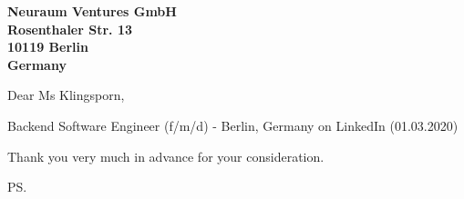 \documentclass[a4paper]{cover-letter}
\begin{document}
\longindentation=0pt

\newcommand{\companyName}{Neuraum Ventures GmbH}

\begin{letter}{\bfseries \companyName\\Rosenthaler Str. 13\\10119 Berlin\\Germany}


\date{Berlin, \today}

\opening{Dear Ms Klingsporn,}{Backend Software Engineer (f/m/d) - Berlin, Germany on LinkedIn (01.03.2020)}



%


\closing{ Thank you very much in advance for your consideration.}
\vspace{20pt}
\ps

\vspace{\fill}

\end{letter}
\end{document}
